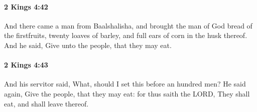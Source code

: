 		\paragraph{2 Kings 4:42} %
			\label{2KINGS-4-42}

			And there came a man from Baalshalisha, and brought the man of God bread of the firstfruits, twenty loaves of barley, and full ears of corn in the husk thereof. And he said, Give unto the people, that they may eat.


		\paragraph{2 Kings 4:43} %
			\label{2KINGS-4-43}

			And his servitor said, What, should I set this before an hundred men? He said again, Give the people, that they may eat: for thus saith the LORD, They shall eat, and shall leave thereof.

